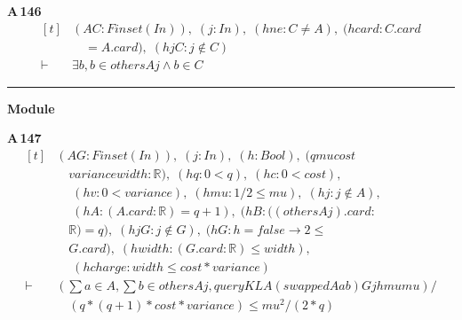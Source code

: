 \noindent\textbf{A\,146}\quad{}
{\footnotesize\[ \begin{aligned}[t]
&(\mathit{A} \mathit{C} : \mathit{Finset} (\mathit{I} \mathit{n})),\; (\mathit{j} : \mathit{I} \mathit{n}),\; (\mathit{hne} : \mathit{C} \neq \mathit{A}),\; (\mathit{hcard} : \mathit{C}.\mathit{card}\\
&\quad =\mathit{A}.\mathit{card}),\; (\mathit{hjC} : \mathit{j} \notin \mathit{C})\\
\vdash\;&\exists \mathit{b},\mathit{b} \in \mathit{others} \mathit{A} \mathit{j} \wedge \mathit{b} \in \mathit{C}
\end{aligned} \]}

\vspace{4pt}\noindent\rule{\columnwidth}{0.4pt}\par\vspace{2pt}
\noindent\textbf{Module }\par\vspace{3pt}

\noindent\textbf{A\,147}\quad{}
{\footnotesize\[ \begin{aligned}[t]
&(\mathit{A} \mathit{G} : \mathit{Finset} (\mathit{I} \mathit{n})),\; (\mathit{j} : \mathit{I} \mathit{n}),\; (\mathit{h} : \mathit{Bool}),\; (\mathit{q} \mathit{mu} \mathit{cost}\\
&\quad \mathit{variance} \mathit{width} : \mathbb{R} ),\; (\mathit{hq} : 0<\mathit{q}),\; (\mathit{hc} : 0<\mathit{cost}),\\
&\quad \; (\mathit{hv} : 0<\mathit{variance}),\; (\mathit{hmu} : 1/2 \leq \mathit{mu}),\; (\mathit{hj} : \mathit{j} \notin \mathit{A}),\\
&\quad \; (\mathit{hA} : (\mathit{A}.\mathit{card}:\mathbb{R} )=\mathit{q}+1),\; (\mathit{hB} : ((\mathit{others} \mathit{A} \mathit{j}).\mathit{card}:\\
&\quad \mathbb{R} )=\mathit{q}),\; (\mathit{hjG} : \mathit{j} \notin \mathit{G}),\; (\mathit{hG} : \mathit{h}=\mathit{false} \to 2 \leq\\
&\quad \mathit{G}.\mathit{card}),\; (\mathit{hwidth} : (\mathit{G}.\mathit{card}:\mathbb{R} ) \leq \mathit{width}),\\
&\quad \; (\mathit{hcharge} : \mathit{width} \leq \mathit{cost}*\mathit{variance})\\
\vdash\;&(\textstyle\sum \mathit{a} \in \mathit{A},\textstyle\sum \mathit{b} \in \mathit{others} \mathit{A} \mathit{j},\mathit{queryKL} \mathit{A} (\mathit{swapped} \mathit{A} \mathit{a} \mathit{b}) \mathit{G} \mathit{j} \mathit{h} \mathit{mu} \mathit{mu})/\\
&\quad (\mathit{q}*(\mathit{q}+1)*\mathit{cost}*\mathit{variance}) \leq \mathit{mu}^{2}/(2*\mathit{q})
\end{aligned} \]}

